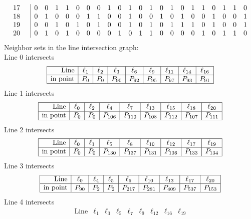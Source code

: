 \documentclass{article}
\begin{document}
{{$$\begin{array}{rr|*{21}r}
17 &  & 0 & 0 & 1 & 1 & 0 & 0 & 0 & 1 & 0 & 1 & 0 & 1 & 0 & 1 & 0 & 1 & 1 & 0 & 1 & 1 & 0\\
18 &  & 0 & 1 & 0 & 0 & 0 & 1 & 1 & 0 & 0 & 1 & 0 & 0 & 1 & 0 & 1 & 0 & 0 & 1 & 0 & 0 & 1\\
19 &  & 0 & 0 & 1 & 0 & 1 & 0 & 1 & 0 & 0 & 1 & 0 & 1 & 0 & 1 & 1 & 1 & 0 & 1 & 0 & 0 & 1\\
20 &  & 0 & 1 & 0 & 1 & 0 & 0 & 0 & 0 & 1 & 0 & 1 & 1 & 0 & 0 & 0 & 0 & 1 & 0 & 1 & 1 & 0\\
\end{array}
$$
}%
Neighbor sets in the line intersection graph:\\
Line 0 intersects 
$$
\begin{array}{|r*{8}{|c}|}
\hline
\mbox{Line}  & \ell_{1} & \ell_{2} & \ell_{3} & \ell_{6} & \ell_{9} & \ell_{11} & \ell_{14} & \ell_{16}\\
\hline
\mbox{in point}  & P_{0} & P_{0} & P_{90} & P_{92} & P_{95} & P_{97} & P_{93} & P_{91}\\
\hline
\end{array}
$$
Line 1 intersects 
$$
\begin{array}{|r*{8}{|c}|}
\hline
\mbox{Line}  & \ell_{0} & \ell_{2} & \ell_{4} & \ell_{7} & \ell_{13} & \ell_{15} & \ell_{18} & \ell_{20}\\
\hline
\mbox{in point}  & P_{0} & P_{0} & P_{106} & P_{110} & P_{108} & P_{112} & P_{107} & P_{111}\\
\hline
\end{array}
$$
Line 2 intersects 
$$
\begin{array}{|r*{8}{|c}|}
\hline
\mbox{Line}  & \ell_{0} & \ell_{1} & \ell_{5} & \ell_{8} & \ell_{10} & \ell_{12} & \ell_{17} & \ell_{19}\\
\hline
\mbox{in point}  & P_{0} & P_{0} & P_{130} & P_{137} & P_{131} & P_{136} & P_{133} & P_{134}\\
\hline
\end{array}
$$
Line 3 intersects 
$$
\begin{array}{|r*{8}{|c}|}
\hline
\mbox{Line}  & \ell_{0} & \ell_{4} & \ell_{5} & \ell_{6} & \ell_{10} & \ell_{13} & \ell_{17} & \ell_{20}\\
\hline
\mbox{in point}  & P_{90} & P_{2} & P_{2} & P_{217} & P_{281} & P_{409} & P_{537} & P_{153}\\
\hline
\end{array}
$$
Line 4 intersects 
$$
\begin{array}{|r*{8}{|c}|}
\hline
\mbox{Line}  & \ell_{1} & \ell_{3} & \ell_{5} & \ell_{7} & \ell_{9} & \ell_{12} & \ell_{16} & \ell_{19}\\

\end{array}$$}
\end{document}
